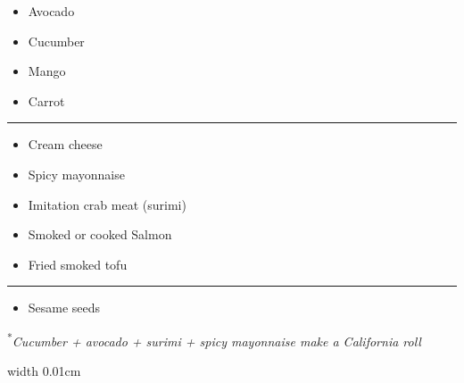 \documentclass[landscape, a4paper]{article}
\begin{document}
\begin{minipage}[t]{0.31\textwidth}
	\begin{minipage}[t]{0.48\textwidth}
		\begin{itemize}[itemsep=0pt, topsep=0pt, parsep=0pt, partopsep=0pt]
			\item Avocado
			\item Cucumber
			\item Mango
			\item Carrot
		\end{itemize}
		\begin{center}
			\vspace{-0.1cm}
			\color{PrimaryColor}\rule{0.9\textwidth}{0.25mm}
		\end{center}
		\begin{itemize}[itemsep=0pt, topsep=0pt, parsep=0pt, partopsep=0pt]
			\item Cream cheese
			\item Spicy mayonnaise
		\end{itemize}
	\end{minipage}
	\hfill
	\begin{minipage}[t]{0.48\textwidth}
		\begin{itemize}[itemsep=0pt, topsep=0pt, parsep=0pt, partopsep=0pt]
			\item Imitation crab meat (surimi)
			\item Smoked or cooked Salmon
			\item Fried smoked tofu
		\end{itemize}
		\begin{center}
			\vspace{-0.1cm}
			\color{PrimaryColor}\rule{0.9\textwidth}{0.25mm}
		\end{center}
		\begin{itemize}[itemsep=0pt, topsep=0pt, parsep=0pt, partopsep=0pt]
			\item Sesame seeds
		\end{itemize}
		\vspace{0.15cm}
		{\raggedright\tiny\textsuperscript{*}\textit{Cucumber + avocado + surimi + spicy mayonnaise make a California roll}\par}
	\end{minipage}

\end{minipage}%
\hfill\color{DividerColor}%
\vrule width 0.01cm
\hfill\color{SoyBrown}%
\end{document}
